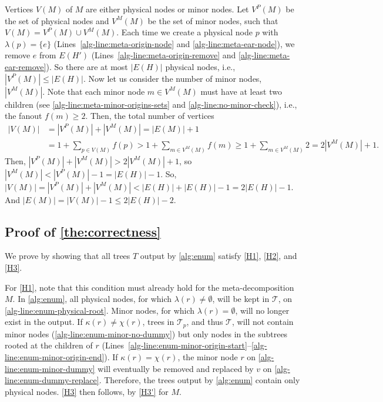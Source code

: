     Vertices $V(M)$ of $M$ are either physical nodes or minor nodes. Let $V^P(M)$ be the set of physical nodes and $V^M(M)$ be the set of minor nodes, such that $V(M) = V^P(M) \cup V^M(M)$.
    Each time we create a physical node $p$ with $\lambda(p) = \{ e \}$ (Lines~\ref{alg-line:meta-origin-node} and \ref{alg-line:meta-ear-node}), we remove $e$ from $E(H')$ (Lines~\ref{alg-line:meta-origin-remove} and \ref{alg-line:meta-ear-remove}).
    So there are at most $|E(H)|$ physical nodes, i.e., $|V^P(M)| \leq |E(H)|$.
    Now let us consider the number of minor nodes, $|V^M(M)|$.
    Note that each minor node $m \in V^M(M)$ must have at least two children (see \cref{alg-line:meta-minor-origins-sets} and \cref{alg-line:no-minor-check}), i.e., the fanout $f(m) \geq 2$.
    Then, the total number of vertices
    \begin{align*}
        |V(M)| &= |V^P(M)| + |V^M(M)| = |E(M)| + 1 \\
        & = 1 + \sum_{p \in V(M)} f(p)
        > 1 + \sum_{m \in V^M(M)} f(m) \geq 1 + \sum_{m \in V^M(M)} 2 = 2|V^M(M)| + 1.
    \end{align*}
    Then, $|V^P(M)| + |V^M(M)| > 2|V^M(M)| + 1$, so $|V^M(M)| < |V^P(M)| - 1 = |E(H)| - 1$.
    So, $|V(M)| = |V^P(M)| + |V^M(M)| < |E(H)| + |E(H)| - 1 = 2|E(H)| - 1$.
    And $|E(M)| = |V(M)| - 1 \leq 2|E(H)| - 2$.

\subsection{Proof of \cref{the:correctness}}

    We prove by showing that all trees $T$ output by \cref{alg:enum} satisfy \ref{H1}, \ref{H2}, and \ref{H3}.

    For \ref{H1}, note that this condition must already hold for the meta-decomposition $M$. In \cref{alg:enum}, all physical nodes, for which $\lambda(r) \neq \emptyset$, will be kept in $\mathcal{T}$, on \cref{alg-line:enum-physical-root}.
    Minor nodes, for which $\lambda(r) = \emptyset$, will no longer exist in the output. If $\kappa(r) \neq \chi(r)$, trees in $\mathcal{T}_p$, and thus $\mathcal{T}$, will not contain minor nodes (\cref{alg-line:enum-minor-no-dummy}) but only nodes in the subtrees rooted at the children of $r$ (Lines~\ref{alg-line:enum-minor-origin-start}--\ref{alg-line:enum-minor-origin-end}). If $\kappa(r) = \chi(r)$, the minor node $r$ on \cref{alg-line:enum-minor-dummy} will eventually be removed and replaced by $v$ on \cref{alg-line:enum-dummy-replace}. Therefore, the trees output by \cref{alg:enum} contain only physical nodes. \ref{H3} then follows, by \ref{H3'} for $M$.

